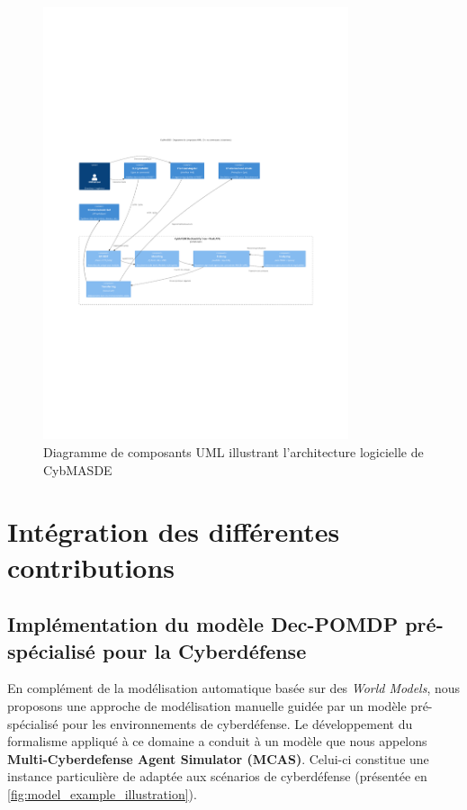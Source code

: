 \begin{figure}
  \centering
  \includegraphics[trim={2.25cm 9cm 2.25cm 10cm},clip,width=0.8\textwidth]{figures/CybMASDE_internal_component_diagram.pdf}
  \caption{Diagramme de composants UML illustrant l'architecture logicielle de CybMASDE}
  \label{fig:cybmasde_uml}
\end{figure}

\section{Intégration des différentes contributions}

\subsection{Implémentation du modèle Dec-POMDP pré-spécialisé pour la Cyberdéfense}

En complément de la modélisation automatique basée sur des \textit{World Models}, nous proposons une approche de modélisation manuelle guidée par un modèle pré-spécialisé pour les environnements de cyberdéfense.
Le développement du formalisme  appliqué à ce domaine a conduit à un modèle que nous appelons \textbf{Multi-Cyberdefense Agent Simulator (MCAS)}. Celui-ci constitue une instance particulière de  adaptée aux scénarios de cyberdéfense (présentée en \autoref{fig:model_example_illustration}).

